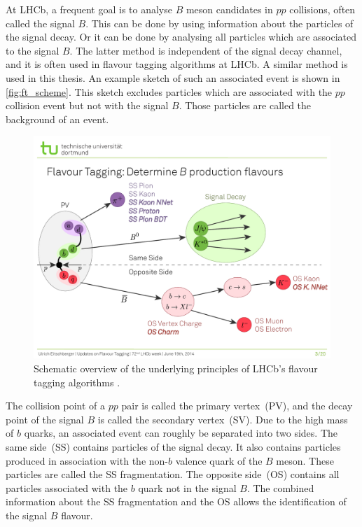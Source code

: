At LHCb, a frequent goal is to analyse $B$ meson candidates in $pp$ collisions, often called the signal $B$.
This can be done by using information about the particles of the signal decay. 
Or it can be done by analysing all particles which are associated to the signal $B$.
The latter method is independent of the signal decay channel, and it is often used in flavour tagging algorithms at LHCb. 
A similar method is used in this thesis.
An example sketch of such an associated event is shown in \autoref{fig:ft_scheme}. 
This sketch excludes particles which are associated with the $pp$ collision event but not with the signal $B$.
Those particles are called the background of an event.

\begin{figure}
    \centering
    \includegraphics[width=\textwidth]{images/FlavourTaggingScheme.pdf}
    \caption{Schematic overview of the underlying principles of LHCb's flavour tagging algorithms \cite{ft_scheme}.}
    \label{fig:ft_scheme}
\end{figure}

The collision point of a $pp$ pair is called the primary vertex~(PV), and the decay point of the signal $B$ is called the secondary vertex~(SV).
Due to the high mass of $b$ quarks, an associated event can roughly be separated into two sides.
The same side~(SS) contains particles of the signal decay.
It also contains particles produced in association with the non-$b$ valence quark of the $B$ meson.
These particles are called the SS fragmentation.
The opposite side~(OS) contains all particles associated with the $b$ quark not in the signal $B$.
The combined information about the SS fragmentation and the OS allows the identification of the signal $B$ flavour.
